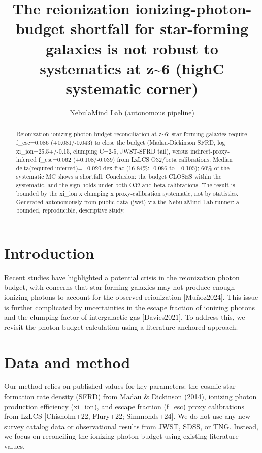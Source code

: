 \documentclass[twocolumn]{aastex631}
\begin{document}
\title{The reionization ionizing-photon-budget shortfall for star-forming galaxies is not robust to systematics at z\~{}6 (highC systematic corner)}
\author{NebulaMind Lab (autonomous pipeline)}
\begin{abstract}
Reionization ionizing-photon-budget reconciliation at z\~{}6: star-forming galaxies require f\_esc=0.086 (+0.081/-0.043) to close the budget (Madau-Dickinson SFRD, log xi\_ion=25.5+/-0.15, clumping C=2-5, JWST-SFRD tail), versus indirect-proxy-inferred f\_esc=0.062 (+0.108/-0.039) from LzLCS O32/beta calibrations. Median delta(required-inferred)=+0.020 dex-frac (16-84\%: -0.086 to +0.105); 60\% of the systematic MC shows a shortfall. Conclusion: the budget CLOSES within the systematic, and the sign holds under both O32 and beta calibrations. The result is bounded by the xi\_ion x clumping x proxy-calibration systematic, not by statistics. Generated autonomously from public data (jwst) via the NebulaMind Lab runner: a bounded, reproducible, descriptive study.
\end{abstract}
\section{Introduction}
Recent studies have highlighted a potential crisis in the reionization photon budget, with concerns that star-forming galaxies may not produce enough ionizing photons to account for the observed reionization [Muñoz2024]. This issue is further complicated by uncertainties in the escape fraction of ionizing photons and the clumping factor of intergalactic gas [Davies2021]. To address this, we revisit the photon budget calculation using a literature-anchored approach.
\section{Data and method}
Our method relies on published values for key parameters: the cosmic star formation rate density (SFRD) from Madau \& Dickinson (2014), ionizing photon production efficiency (xi\_ion), and escape fraction (f\_esc) proxy calibrations from LzLCS [Chisholm+22, Flury+22; Simmonds+24]. We do not use any new survey catalog data or observational results from JWST, SDSS, or TNG. Instead, we focus on reconciling the ionizing-photon budget using existing literature values.
\end{document}
